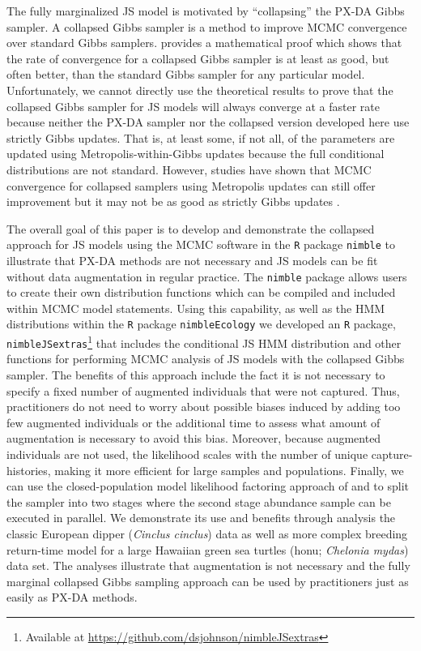 \documentclass[11pt]{article}
\begin{document}
The fully marginalized JS model is motivated by ``collapsing'' the PX-DA Gibbs sampler. A collapsed Gibbs sampler is a method to improve MCMC convergence over standard Gibbs samplers. \cite{Liu1994a} provides a mathematical proof which shows that the rate of convergence for a collapsed Gibbs sampler is at least as good, but often better, than the standard Gibbs sampler for any particular model. Unfortunately, we cannot directly use the theoretical results to prove that the collapsed Gibbs sampler for JS models will always converge at a faster rate because neither the PX-DA sampler nor the collapsed version developed here use strictly Gibbs updates. That is, at least some, if not all, of the parameters are updated using Metropolis-within-Gibbs updates because the full conditional distributions are not standard. However, studies have shown that MCMC convergence for collapsed samplers using Metropolis updates can still offer improvement but it may not be as good as strictly Gibbs updates \citep{VanDykJiao2015a}.  

The overall goal of this paper is to develop and demonstrate the collapsed approach for JS models using the MCMC software in the {\tt R} package {\tt nimble} \citep{Valpine:2017vg} to illustrate that PX-DA methods are not necessary and JS models can be fit without data augmentation in regular practice. The {\tt nimble} package allows users to create their own distribution functions which can be compiled and included within MCMC model statements. Using this capability, as well as the HMM distributions within the {\tt R} package {\tt nimbleEcology} \citep{GoldsteinEtAl2024a} we developed an {\tt R} package, {\tt nimbleJSextras}\footnote{Available at \url{https://github.com/dsjohnson/nimbleJSextras}} that includes the conditional JS HMM distribution and other functions for performing MCMC analysis of JS models with the collapsed Gibbs sampler. The benefits of this approach include the fact it is not necessary to specify a fixed number of augmented individuals that were not captured. Thus, practitioners do not need to worry about possible biases induced by adding too few augmented individuals \citep{link2013cautionary} or the additional time to assess what amount of augmentation is necessary to avoid this bias. Moreover, because augmented individuals are not used, the likelihood scales with the number of unique capture-histories, making it more efficient for large samples and populations. Finally, we can use the closed-population model likelihood factoring approach of \cite{king2015capture} and \cite{Hooten:2023aa} to split the sampler into two stages where the second stage abundance sample can be executed in parallel. We demonstrate its use and benefits through analysis the classic European dipper ({\it Cinclus cinclus}) data as well as more complex breeding return-time model for a large Hawaiian green sea turtles (honu; {\it Chelonia mydas}) data set. The analyses illustrate that augmentation is not necessary and the fully marginal collapsed Gibbs sampling approach can be used by practitioners just as easily as PX-DA methods. 
\end{document}
